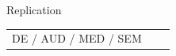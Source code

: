 \documentclass[final]{beamer}
\begin{document}
\begin{frame}{}
\begin{textblock}{67}
\begin{block}{Replication}
\begin{tabular}{c c c}
DE / AUD / MED / SEM \\

\end{tabular}
\end{block}
\end{textblock}
\end{frame}
\end{document}
